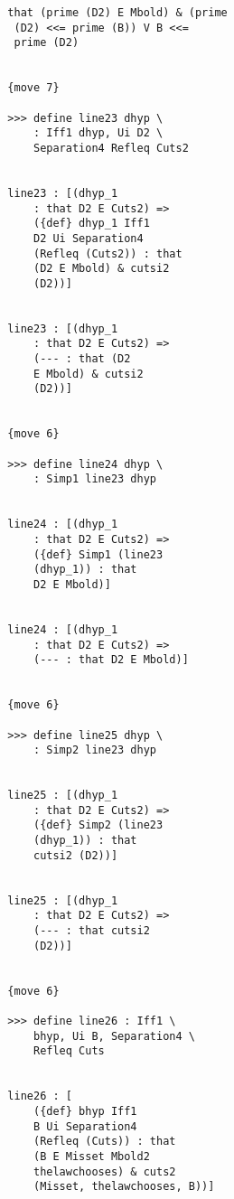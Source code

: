 \documentclass[12pt]{article}
\begin{document}
\begin{verbatim}
                     that (prime (D2) E Mbold) & (prime 
                      (D2) <<= prime (B)) V B <<= 
                      prime (D2)


                     {move 7}

                     >>> define line23 dhyp \
                         : Iff1 dhyp, Ui D2 \
                         Separation4 Refleq Cuts2


                     line23 : [(dhyp_1 
                         : that D2 E Cuts2) => 
                         ({def} dhyp_1 Iff1 
                         D2 Ui Separation4 
                         (Refleq (Cuts2)) : that 
                         (D2 E Mbold) & cutsi2 
                         (D2))]


                     line23 : [(dhyp_1 
                         : that D2 E Cuts2) => 
                         (--- : that (D2 
                         E Mbold) & cutsi2 
                         (D2))]


                     {move 6}

                     >>> define line24 dhyp \
                         : Simp1 line23 dhyp


                     line24 : [(dhyp_1 
                         : that D2 E Cuts2) => 
                         ({def} Simp1 (line23 
                         (dhyp_1)) : that 
                         D2 E Mbold)]


                     line24 : [(dhyp_1 
                         : that D2 E Cuts2) => 
                         (--- : that D2 E Mbold)]


                     {move 6}

                     >>> define line25 dhyp \
                         : Simp2 line23 dhyp


                     line25 : [(dhyp_1 
                         : that D2 E Cuts2) => 
                         ({def} Simp2 (line23 
                         (dhyp_1)) : that 
                         cutsi2 (D2))]


                     line25 : [(dhyp_1 
                         : that D2 E Cuts2) => 
                         (--- : that cutsi2 
                         (D2))]


                     {move 6}

                     >>> define line26 : Iff1 \
                         bhyp, Ui B, Separation4 \
                         Refleq Cuts


                     line26 : [
                         ({def} bhyp Iff1 
                         B Ui Separation4 
                         (Refleq (Cuts)) : that 
                         (B E Misset Mbold2 
                         thelawchooses) & cuts2 
                         (Misset, thelawchooses, B))]



\end{verbatim}
\end{document}
